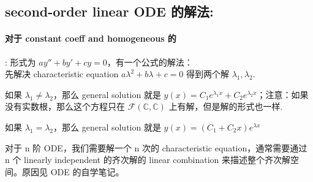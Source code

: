 \documentclass[12pt]{article}
\begin{document}
\subsection{second-order linear ODE 的解法:}
\paragraph{对于 constant coeff and homogeneous 的}: 形式为 $ay'' + by' + cy = 0$，有一个公式的解法：
\\先解决 characteristic equation $a\lambda^2 + b\lambda + c = 0$ 得到两个解 $\lambda_1, \lambda_2$.
\begin{compactenumI}
    \item 如果 $\lambda_1 \not= \lambda_2$，那么 general solution 就是 $y(x) = C_1 e^{\lambda_1 x} + C_2 e^{\lambda_2 x}$；注意：如果没有实数根，那么这个方程只在 $\mathcal{F}(\mathbb{C}, \mathbb{C})$ 上有解，但是解的形式也一样.
    \item 如果 $\lambda_1 = \lambda_2$，那么 general solution 就是 $y(x) = (C_1 + C_2 x) e^{\lambda x}$
\end{compactenumI}

\remark 
对于 n 阶 ODE，我们需要解一个 n 次的 characteristic equation，通常需要通过 n 个 linearly independent 的齐次解的 linear combination 来描述整个齐次解空间。原因见 ODE 的自学笔记。
\end{document}
